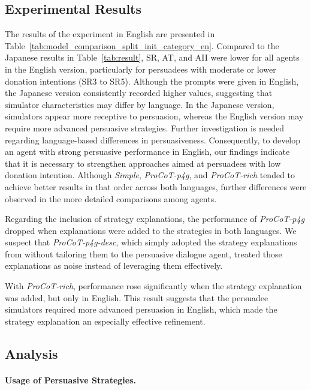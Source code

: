 \documentclass[11pt]{article}
\begin{document}
\subsection{Experimental Results}
The results of the experiment in English are presented in Table~\ref{tab:model_comparison_split_init_category_en}. 
Compared to the Japanese results in Table~\ref{tab:result}, SR, AT, and AII were lower for all agents in the English version, particularly for persuadees with moderate or lower donation intentions (SR3 to SR5). 
Although the prompts were given in English, the Japanese version consistently recorded higher values, suggesting that simulator characteristics may differ by language. 
In the Japanese version, simulators appear more receptive to persuasion, whereas the English version may require more advanced persuasive strategies. 
Further investigation is needed regarding language-based differences in persuasiveness. 
Consequently, to develop an agent with strong persuasive performance in English, our findings indicate that it is necessary to strengthen approaches aimed at persuadees with low donation intention. 
Although \textit{Simple}, \textit{ProCoT-p4g}, and \textit{ProCoT-rich} tended to achieve better results in that order across both languages, further differences were observed in the more detailed comparisons among agents.

Regarding the inclusion of strategy explanations, the performance of \textit{ProCoT-p4g} dropped when explanations were added to the strategies in both languages. 
We suspect that \textit{ProCoT-p4g-desc}, which simply adopted the strategy explanations from \citet{wang-etal-2019-persuasion} without tailoring them to the persuasive dialogue agent, treated those explanations as noise instead of leveraging them effectively.

With \textit{ProCoT-rich}, performance rose significantly when the strategy explanation was added, but only in English.
This result suggests that the persuadee simulators required more advanced persuasion in English, which made the strategy explanation an especially effective refinement.

\subsection{Analysis}
\paragraph{Usage of Persuasive Strategies.}
\end{document}

